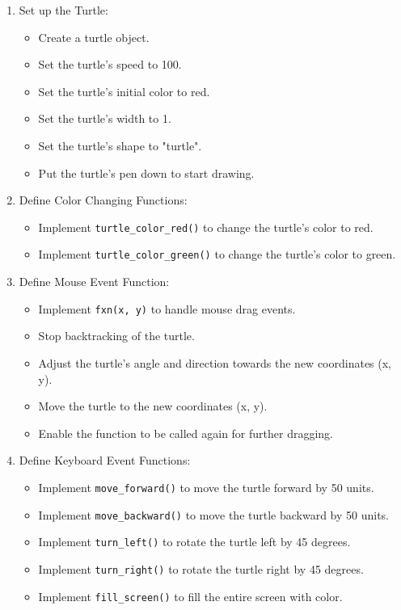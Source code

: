 \documentclass[12pt]{book}
\begin{document}
\begin{enumerate}[label=\arabic*.]
  \item Set up the Turtle:
    \begin{itemize}
      \item Create a turtle object.
      \item Set the turtle's speed to 100.
      \item Set the turtle's initial color to red.
      \item Set the turtle's width to 1.
      \item Set the turtle's shape to "turtle".
      \item Put the turtle's pen down to start drawing.
    \end{itemize}
  
  \item Define Color Changing Functions:
    \begin{itemize}
      \item Implement \texttt{turtle\_color\_red()} to change the turtle's color to red.
      \item Implement \texttt{turtle\_color\_green()} to change the turtle's color to green.
    \end{itemize}
  
  \item Define Mouse Event Function:
    \begin{itemize}
      \item Implement \texttt{fxn(x, y)} to handle mouse drag events.
      \item Stop backtracking of the turtle.
      \item Adjust the turtle's angle and direction towards the new coordinates (x, y).
      \item Move the turtle to the new coordinates (x, y).
      \item Enable the function to be called again for further dragging.
    \end{itemize}
  
  \item Define Keyboard Event Functions:
    \begin{itemize}
      \item Implement \texttt{move\_forward()} to move the turtle forward by 50 units.
      \item Implement \texttt{move\_backward()} to move the turtle backward by 50 units.
      \item Implement \texttt{turn\_left()} to rotate the turtle left by 45 degrees.
      \item Implement \texttt{turn\_right()} to rotate the turtle right by 45 degrees.
      \item Implement \texttt{fill\_screen()} to fill the entire screen with color.
    \end{itemize}
  

\end{enumerate}
\end{document}
